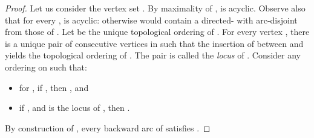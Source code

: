 \begin{proof}
Let us consider the vertex set . By maximality of ,  is acyclic. Observe also that for every ,  is acyclic: otherwise  would contain a directed-  with  arc-disjoint from those of . Let  be the unique topological ordering of . For every vertex , there is a unique pair  of  consecutive vertices in  such that the insertion of  between  and  yields the topological ordering of . The pair  is called the \emph{locus} of . Consider any ordering  on  such that: 
\begin{itemize}
\vspace{-0.2cm}
\item for , if , then , and 
\vspace{-0.2cm}
\item if , and  is the locus of , then . 
\end{itemize}
By construction of , every backward arc  of  satisfies .
\end{proof}

